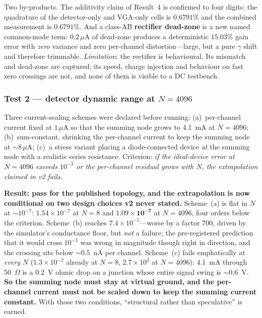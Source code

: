 \documentclass[11pt]{article}
\begin{document}
Two by-products. The additivity claim of Result~4 is confirmed to four digits: the quadrature of the detector-only and VGA-only cells is $0.6791\%$ and the combined measurement is $0.6791\%$. And a class-AB \textbf{rectifier dead-zone} is a new named common-mode term: $0.2\,\mu$A of dead-zone produces a deterministic $15.03\%$ gain error with \textit{zero} variance and zero per-channel distortion---large, but a pure $\gamma$ shift and therefore trimmable. \textit{Limitation}: the rectifier is behavioural. Its mismatch and dead-zone are captured; its speed, charge injection and behaviour on fast zero crossings are not, and none of them is visible to a DC testbench.

\subsubsection{Test 2 --- detector dynamic range at $N = 4096$}

Three current-scaling schemes were declared before running: (a)~per-channel current fixed at $1\,\mu$A so that the summing node grows to 4.1~mA at $N=4096$; (b)~sum-constant, shrinking the per-channel current to keep the summing node at ${\sim}8\,\mu$A; (c)~a stress variant placing a diode-connected device \textit{at} the summing node with a realistic series resistance. Criterion: \textit{if the ideal-device error at $N = 4096$ exceeds $10^{-3}$ or the per-channel residual grows with $N$, the extrapolation claimed in v2 fails.}

\textbf{Result: pass for the published topology, and the extrapolation is now conditional on two design choices v2 never stated.} Scheme~(a) is flat in $N$ at ${\sim}10^{-7}$: $1.54\times10^{-7}$ at $N=8$ and $\mathbf{1.09\times10^{-7}}$ at $N=4096$, four orders below the criterion. Scheme~(b) reaches $7.4\times10^{-5}$---worse by a factor 700, driven by the simulator's conductance floor, but \textit{not} a failure; the pre-registered prediction that it would cross $10^{-3}$ was wrong in magnitude though right in direction, and the crossing sits below ${\sim}0.5$~nA per channel. Scheme~(c) fails emphatically at \textit{every} $N$ ($1.3\times10^{-2}$ already at $N=8$, $2.7\times10^{3}$ at $N=4096$): 4.1~mA through 50~$\Omega$ is a 0.2~V ohmic drop on a junction whose entire signal swing is ${\sim}0.6$~V. \textbf{So the summing node must stay at virtual ground, and the per-channel current must not be scaled down to keep the summing current constant.} With those two conditions, ``structural rather than speculative'' is earned.
\end{document}
